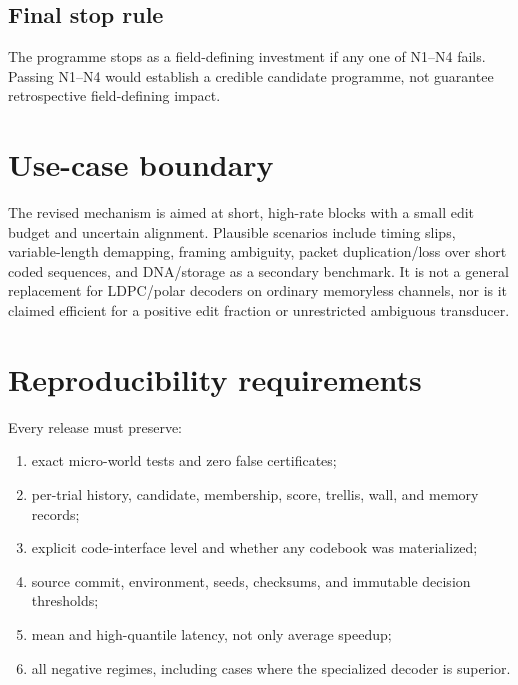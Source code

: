 \documentclass[11pt]{article}
\theoremstyle{definition}
\theoremstyle{remark}
\begin{document}
\subsection{Final stop rule}
The programme stops as a field-defining investment if any one of N1--N4 fails.  Passing N1--N4 would establish a credible candidate programme, not guarantee retrospective field-defining impact.

\section{Use-case boundary}
The revised mechanism is aimed at short, high-rate blocks with a small edit budget and uncertain alignment.  Plausible scenarios include timing slips, variable-length demapping, framing ambiguity, packet duplication/loss over short coded sequences, and DNA/storage as a secondary benchmark.  It is not a general replacement for LDPC/polar decoders on ordinary memoryless channels, nor is it claimed efficient for a positive edit fraction or unrestricted ambiguous transducer.

\section{Reproducibility requirements}
Every release must preserve:
\begin{enumerate}[leftmargin=2em]
\item exact micro-world tests and zero false certificates;
\item per-trial history, candidate, membership, score, trellis, wall, and memory records;
\item explicit code-interface level and whether any codebook was materialized;
\item source commit, environment, seeds, checksums, and immutable decision thresholds;
\item mean and high-quantile latency, not only average speedup;
\item all negative regimes, including cases where the specialized decoder is superior.
\end{enumerate}
\end{document}
